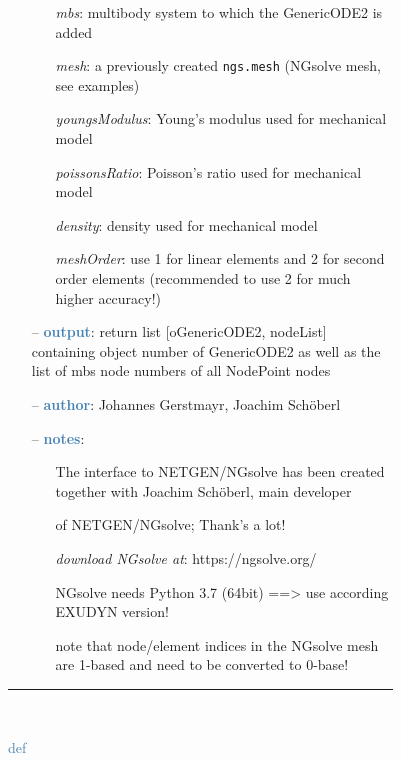 \begin{itemize}[leftmargin=1.4cm]
\begin{itemize}[leftmargin=0.5cm]
\begin{itemize}[leftmargin=1.4cm]
\begin{itemize}[leftmargin=1.4cm]
\begin{itemize}[leftmargin=0.5cm]
\begin{itemize}[leftmargin=0.7cm]
  \begin{itemize}[leftmargin=1.2cm]
\setlength{\itemindent}{-0.7cm}
    \item[] {\it mbs}: multibody system to which the GenericODE2 is added
    \item[] {\it     mesh}: a previously created \texttt{ngs.mesh} (NGsolve mesh, see examples)
    \item[] {\it     youngsModulus}: Young's modulus used for mechanical model
    \item[] {\it     poissonsRatio}: Poisson's ratio used for mechanical model
    \item[] {\it     density}: density used for mechanical model
    \item[] {\it     meshOrder}: use 1 for linear elements and 2 for second order elements (recommended to use 2 for much higher accuracy!)
  \end{itemize}
  \item[--]  \textcolor{steelblue}{\bf output}: return list [oGenericODE2, nodeList] containing object number of GenericODE2 as well as the list of mbs node numbers of all NodePoint nodes  \item[--]  \textcolor{steelblue}{\bf author}: Johannes Gerstmayr, Joachim Sch\"oberl  \item[--]  \textcolor{steelblue}{\bf notes}: \vspace{-6pt}
  \begin{itemize}[leftmargin=1.2cm]
\setlength{\itemindent}{-0.7cm}
    \item[] The interface to NETGEN/NGsolve has been created together with Joachim Sch\"oberl, main developer
    \item[]   of NETGEN/NGsolve; Thank's a lot!
    \item[] {\it   download NGsolve at}: https://ngsolve.org/
    \item[]   NGsolve needs Python 3.7 (64bit) ==> use according EXUDYN version!
    \item[]   note that node/element indices in the NGsolve mesh are 1-based and need to be converted to 0-base!
  \end{itemize}
\vspace{12pt}\end{itemize}
%
\noindent\rule{8cm}{0.75pt}\vspace{1pt} \\ 
\begin{flushleft}
\noindent \textcolor{steelblue}{def {\bf {}}}\label{sec:FEM:FEMinterface:ComputeEigenmodes}

\end{flushleft}
\end{itemize}
\end{itemize}
\end{itemize}
\end{itemize}
\end{itemize}
